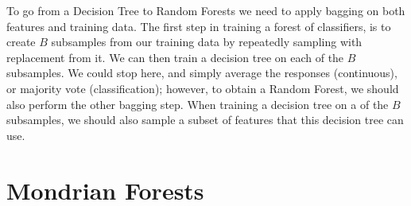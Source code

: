 To go from a Decision Tree to Random Forests we need to apply bagging on both
features and training data. The first step in training a forest of classifiers,
is to create $B$ subsamples from our training data by repeatedly sampling with
replacement from it. We can then train a decision tree on each of the $B$
subsamples. We could stop here, and simply average the responses (continuous),
or majority vote (classification); however, to obtain a Random Forest, we should
also perform the other bagging step. When training a decision tree on a of the
$B$ subsamples, we should also sample a subset of features that this decision
tree can use.

\section{Mondrian Forests}
\label{appendix:supervised:mondrian}


